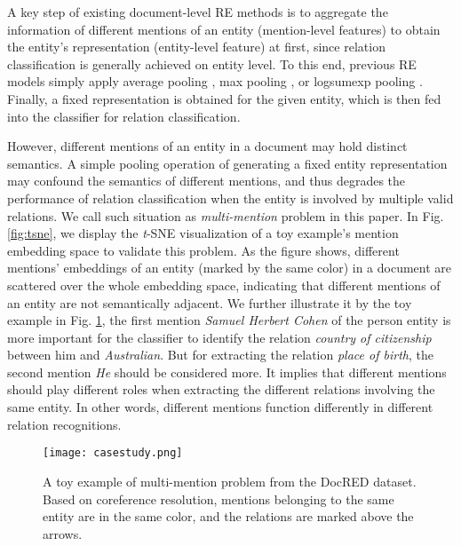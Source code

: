 \documentclass[11pt]{article}
\begin{document}
A key step of existing document-level RE methods is to aggregate the information of different mentions of an entity (mention-level features) to obtain the entity's representation (entity-level feature) at first, since relation classification is generally achieved on entity level. To this end, 
previous RE models simply apply average pooling \cite{ye-etal-2020-coreferential,xu2021entity}, max pooling \cite{li-etal-2021-mrn}, or logsumexp pooling \cite{zhou2021document,zhang2021document}. Finally, a fixed representation is obtained for the given entity, which is then fed into the classifier for relation classification.


However, different mentions of an entity in a document may hold distinct semantics. A simple pooling operation of generating a fixed entity representation may confound the semantics of different mentions, and thus degrades the performance of relation classification when the entity is involved by multiple valid relations. We call such situation as \emph{multi-mention} problem in this paper. In Fig. \ref{fig:tsne}, we display the \emph{t}-SNE \cite{van2008visualizing} visualization of a toy example's mention embedding space to validate this problem. As the figure shows, different mentions' embeddings of an entity (marked by the same color) in a document are scattered over the whole embedding space, indicating that different mentions of an entity are not semantically adjacent. We further illustrate it by the toy example in Fig. \ref{fig:casestudy}, the first mention \textit{Samuel Herbert Cohen} of the person entity is more important for the classifier to identify the relation \textit{country of citizenship} between him and \textit{Australian}. But for extracting the relation \textit{place of birth}, the second mention \textit{He} should be considered more. It implies that different mentions should play different roles when extracting the different relations involving the same entity. In other words, different mentions function differently in different relation recognitions. 

\begin{figure}[t]
\texttt{[image: casestudy.png]}
\caption{A toy example of multi-mention problem from the DocRED dataset. Based on coreference resolution, mentions belonging to the same entity are in the same color, and the relations are marked above the arrows.}
    \label{fig:casestudy}
\end{figure}
\end{document}
